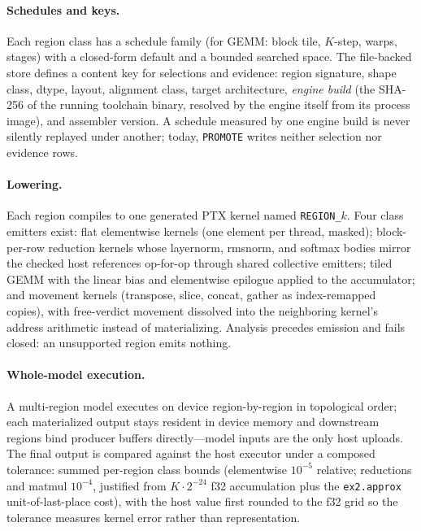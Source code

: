 \documentclass[11pt]{article}
\newcommand{\code}[1]{\texttt{#1}}
\begin{document}
\paragraph{Schedules and keys.} Each region class has a schedule family
(for GEMM: block tile, $K$-step, warps, stages) with a closed-form
default and a bounded searched space. The file-backed store defines a
content key for selections and evidence: region signature, shape class,
dtype, layout, alignment class, target architecture, \emph{engine build}
(the SHA-256 of the running toolchain binary, resolved by the engine
itself from its process image), and assembler version. A schedule
measured by one engine build is never silently replayed under another;
today, \code{PROMOTE} writes neither selection nor evidence rows.

\paragraph{Lowering.} Each region compiles to one generated PTX kernel
named \code{REGION\_$k$}. Four class emitters exist: flat elementwise
kernels (one element per thread, masked); block-per-row reduction kernels
whose layernorm, rmsnorm, and softmax bodies mirror the checked host
references op-for-op through shared collective emitters; tiled GEMM with
the linear bias and elementwise epilogue applied to the accumulator; and
movement kernels (transpose, slice, concat, gather as index-remapped
copies), with free-verdict movement dissolved into the neighboring
kernel's address arithmetic instead of materializing. Analysis precedes
emission and fails closed: an unsupported region emits nothing.

\paragraph{Whole-model execution.} A multi-region model executes on
device region-by-region in topological order; each materialized output
stays resident in device memory and downstream regions bind producer
buffers directly---model inputs are the only host uploads. The final
output is compared against the host executor under a composed tolerance:
summed per-region class bounds (elementwise $10^{-5}$ relative;
reductions and matmul $10^{-4}$, justified from $K\cdot2^{-24}$ f32
accumulation plus the \code{ex2.approx} unit-of-last-place cost), with
the host value first rounded to the f32 grid so the tolerance measures
kernel error rather than representation.
\end{document}
